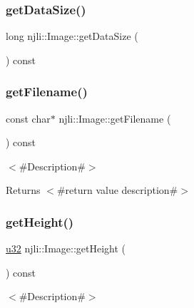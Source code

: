 \mbox{\label{classnjli_1_1_image_a501bfe4e71d61a4126b98f6f9b2ef76d}} 
\subsubsection{\texorpdfstring{get\+Data\+Size()}{getDataSize()}}
{\footnotesize\ttfamily long njli\+::\+Image\+::get\+Data\+Size (\begin{DoxyParamCaption}{ }\end{DoxyParamCaption}) const}

\mbox{\label{classnjli_1_1_image_a02b7315aabbab49269b1b6091c7c0ae5}} 
\subsubsection{\texorpdfstring{get\+Filename()}{getFilename()}}
{\footnotesize\ttfamily const char$\ast$ njli\+::\+Image\+::get\+Filename (\begin{DoxyParamCaption}{ }\end{DoxyParamCaption}) const}

$<$\#\+Description\#$>$

\begin{DoxyReturn}{Returns}
$<$\#return value description\#$>$ 
\end{DoxyReturn}
\mbox{\label{classnjli_1_1_image_af3552099b60aaa6a20a94d12d25cd01e}} 
\subsubsection{\texorpdfstring{get\+Height()}{getHeight()}}
{\footnotesize\ttfamily \mbox{\hyperlink{_util_8h_a10e94b422ef0c20dcdec20d31a1f5049}{u32}} njli\+::\+Image\+::get\+Height (\begin{DoxyParamCaption}{ }\end{DoxyParamCaption}) const}

$<$\#\+Description\#$>$

